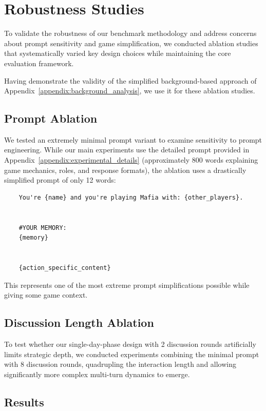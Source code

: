 \documentclass[sigconf]{aamas}
\begin{document}
\section{Robustness Studies}
\label{appendix:ablation}

To validate the robustness of our benchmark methodology and address concerns about prompt sensitivity and game simplification, we conducted ablation studies that systematically varied key design choices while maintaining the core evaluation framework.

Having demonstrate the validity of the simplified background-based approach of Appendix~\ref{appendix:background_analysis}, we use it for these ablation studies.

\subsection{Prompt Ablation}

We tested an extremely minimal prompt variant to examine sensitivity to prompt engineering. While our main experiments use the detailed prompt provided in Appendix~\ref{appendix:experimental_details} (approximately 800 words explaining game mechanics, roles, and response formats), the ablation uses a drastically simplified prompt of only 12 words:

\begin{verbatim}
    You're {name} and you're playing Mafia with: {other_players}.


    #YOUR MEMORY:
    {memory}


    {action_specific_content}
\end{verbatim}

This represents one of the most extreme prompt simplifications possible while giving some game context.

\subsection{Discussion Length Ablation}

To test whether our single-day-phase design with 2 discussion rounds artificially limits strategic depth, we conducted experiments combining the minimal prompt with 8 discussion rounds, quadrupling the interaction length and allowing significantly more complex multi-turn dynamics to emerge.

\subsection{Results}
\end{document}
